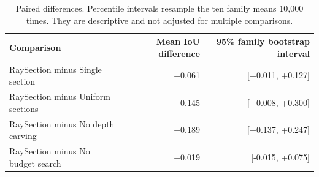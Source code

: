 \begin{table}[h]
\centering\small
\begin{tabular}{lrr}
\toprule
Comparison & Mean IoU difference & 95\% family bootstrap interval \\
\midrule
RaySection minus Single section & +0.061 & [+0.011, +0.127] \\
RaySection minus Uniform sections & +0.145 & [+0.008, +0.300] \\
RaySection minus No depth carving & +0.189 & [+0.137, +0.247] \\
RaySection minus No budget search & +0.019 & [-0.015, +0.075] \\
\bottomrule
\end{tabular}
\caption{Paired differences. Percentile intervals resample the ten family means
10,000 times. They are descriptive and not adjusted for multiple comparisons.}
\end{table}
